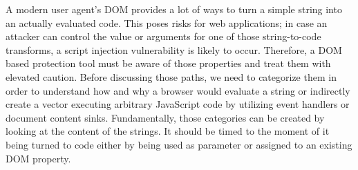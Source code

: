     A modern user agent's DOM provides a lot of ways to turn a simple string into an actually evaluated code. This poses risks for web applications; in case an attacker can control the value or arguments for one of those string-to-code transforms, a script injection vulnerability is likely to occur. Therefore, a DOM based protection tool must be aware of those properties and treat them with elevated caution. Before discussing those paths, we need to categorize them in order to understand how and why a browser would evaluate a string or indirectly create a vector executing arbitrary JavaScript code by utilizing event handlers or document content sinks. Fundamentally, those categories can be created by looking at the content of the strings. It should be timed to the moment of it being turned to code either by being used as parameter or assigned to an existing DOM property.

